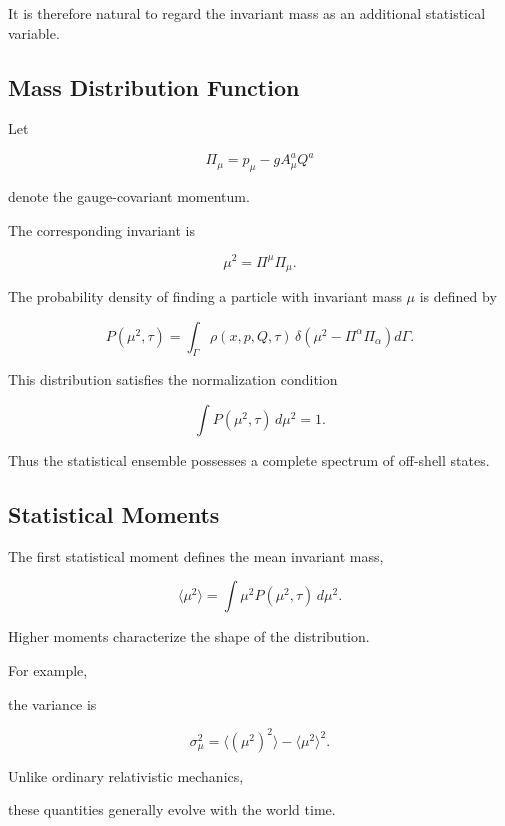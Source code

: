 It is therefore natural to regard the invariant mass as an additional
statistical variable.


\subsection{Mass Distribution Function}

Let

\[
\Pi_\mu
=
p_\mu-gA_\mu^aQ^a
\]

denote the gauge-covariant momentum.

The corresponding invariant is

\[
\mu^2
=
\Pi^\mu\Pi_\mu .
\]

The probability density of finding a particle with invariant mass
\(\mu\) is defined by

\[
\boxed{
P(\mu^2,\tau)
=
\int_\Gamma
\rho(x,p,Q,\tau)\,
\delta\!\left(
\mu^2-\Pi^\alpha\Pi_\alpha
\right)
d\Gamma.
}
\]

This distribution satisfies the normalization condition

\[
\boxed{
\int
P(\mu^2,\tau)
\,d\mu^2
=
1.
}
\]

Thus the statistical ensemble possesses a complete spectrum of
off-shell states.


\subsection{Statistical Moments}

The first statistical moment defines the mean invariant mass,

\[
\boxed{
\langle\mu^2\rangle
=
\int
\mu^2
P(\mu^2,\tau)
\,d\mu^2.
}
\]

Higher moments characterize the shape of the distribution.

For example,

the variance is

\[
\boxed{
\sigma_\mu^2
=
\langle(\mu^2)^2\rangle
-
\langle\mu^2\rangle^2.
}
\]

Unlike ordinary relativistic mechanics,

these quantities generally evolve with the world time.


